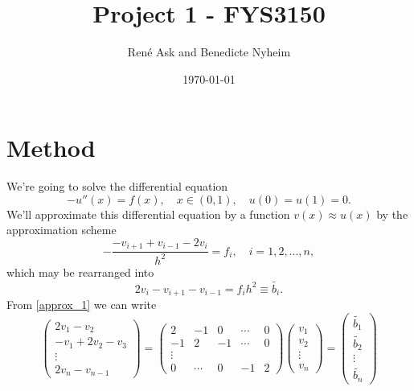 \documentclass[english,notitlepage]{revtex4-1}  %
\begin{document}
\title{Project 1 - FYS3150}      %
\author{René Ask and Benedicte Nyheim}          %
\date{\today}                             %
\noaffiliation                            %
\maketitle                                %

\section{Method}
We're going to solve the differential equation 
\begin{equation}\label{diff_eq}
	-u''(x) = f(x), \quad x \in (0,1), \quad u(0)=u(1)=0.
\end{equation}
We'll approximate this differential equation by a function $v(x) \approx u(x)$ by the 
approximation scheme 
\begin{equation}
	-\frac{-v_{i+1}+v_{i-1} - 2v_i}{h^2} = f_i, \quad i=1,2,...,n,
\end{equation}
which may be rearranged into 
\begin{equation}\label{approx_1}
	2v_i - v_{i+1} - v_{i-1} = f_ih^2 \equiv \tilde{b_i}.
\end{equation}
From \eqref{approx_1} we can write 
\begin{equation}
	\begin{pmatrix}
	2v_1 - v_2 \\ 
	-v_1 + 2v_2 - v_3 \\ 
	\vdots \\
	2v_n - v_{n-1}
	\end{pmatrix}
	=
	\begin{pmatrix}
	2 & -1 & 0  & \cdots & 0 \\
	-1 & 2 & -1 & \cdots & 0 \\
	\vdots \\
	0 & \cdots & 0 & -1 & 2 
	\end{pmatrix}
	\begin{pmatrix}
	v_1 \\ v_2 \\ \vdots \\ v_n
	\end{pmatrix}
	= \begin{pmatrix}
	\tilde{b_1} \\ \tilde{b_2} \\ \vdots \\ \tilde{b_n}
	\end{pmatrix}
\end{equation}
\end{document}
